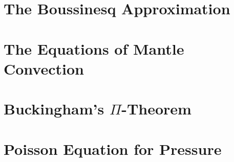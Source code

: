 \documentclass[oneside]{amsbook}
\theoremstyle{definition}
\theoremstyle{remark}
\numberwithin{section}{chapter}
\numberwithin{equation}{chapter}
\begin{document}
\chapter{The Boussinesq Approximation} \label{boussinesq}


\chapter{The Equations of Mantle Convection} \label{mantle_convection}


\appendix
\chapter{Buckingham's $\Pi$-Theorem} \label{appendix_pi}

\chapter{Poisson Equation for Pressure} \label{appendix_poisson}


\backmatter



\printindex
\end{document}
